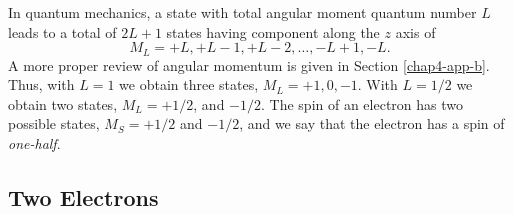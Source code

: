 In quantum mechanics, a state with total angular moment quantum number $L$
leads to a total of $2L + 1$ states having component along the $z$ axis of
\begin{equation}
M_L = + L , + L - 1 , + L - 2 ,\dots , -L + 1 , - L .
\end{equation}
A more proper review of angular momentum is given in Section
\ref{chap4-app-b}.  Thus, with $L = 1$ we obtain three states, 
$M_L = + 1, 0, - 1$. With $L = 1/2$ we obtain two states, $M_L = +
1/2$, and $-1/2$.  The spin of an electron has two possible states,
$M_S = + 1/2$ and $-1/2$, and we say that the electron has a spin of
\emph{one-half}.

\subsection{Two Electrons}

